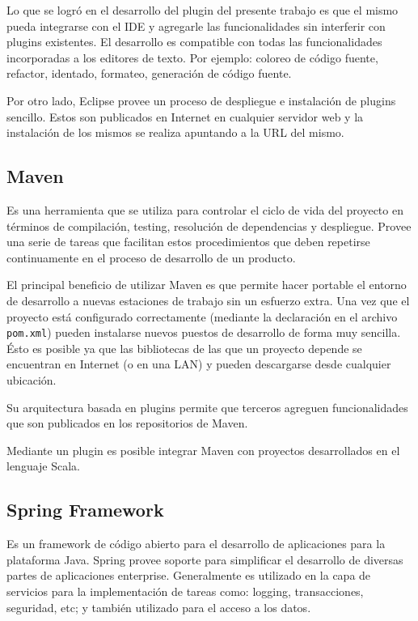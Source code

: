 \documentclass[12pt,a4paper]{article}
\begin{document}
Lo que se logró en el desarrollo del plugin del presente trabajo es que el mismo pueda integrarse con el IDE
y agregarle las funcionalidades sin interferir con plugins existentes. El desarrollo es compatible
con todas las funcionalidades incorporadas a los editores de texto. Por ejemplo: coloreo de código fuente, refactor,
identado, formateo, generación de código fuente.

Por otro lado, Eclipse provee un proceso de despliegue e instalación de plugins sencillo. Estos son publicados 
en Internet en cualquier servidor web y la instalación de los mismos se realiza apuntando a la URL del mismo.

\subsection{Maven}
Es una herramienta que se utiliza para controlar el ciclo de vida del proyecto en términos de compilación, testing,
resolución de dependencias y despliegue. Provee una serie de tareas que facilitan estos procedimientos que deben
repetirse continuamente en el proceso de desarrollo de un producto.

El principal beneficio de utilizar Maven es que permite hacer portable el entorno de desarrollo a nuevas estaciones
de trabajo sin un esfuerzo extra. Una vez que el proyecto está configurado correctamente (mediante la declaración en el 
archivo \texttt{pom.xml}) pueden instalarse nuevos puestos de desarrollo de forma muy sencilla. Ésto es posible
ya que las bibliotecas de las que un proyecto depende se encuentran en Internet (o en una LAN) y pueden descargarse
desde cualquier ubicación.

Su arquitectura basada en plugins permite que terceros agreguen funcionalidades que son publicados en los repositorios
de Maven.

Mediante un plugin es posible integrar Maven con proyectos desarrollados en el lenguaje Scala.

\subsection{Spring Framework}
Es un framework de código abierto para el desarrollo de aplicaciones para la plataforma Java. Spring provee soporte
para simplificar el desarrollo de diversas partes de aplicaciones enterprise. Generalmente es utilizado en
la capa de servicios para la implementación de tareas como: logging, transacciones, seguridad, etc; y también 
utilizado para el acceso a los datos.
\end{document}
